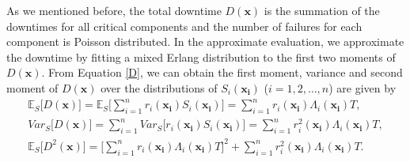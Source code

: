 \documentclass[preprint,12pt]{elsarticle}
\begin{document}
As we mentioned before, the total downtime $D(\boldsymbol{x})$ is the summation of the downtimes for all critical components and the number of failures for each component is Poisson distributed. In the approximate evaluation, we approximate the downtime by fitting a mixed Erlang distribution to the first two moments of $D(\boldsymbol{x})$. From Equation \eqref{D}, we can obtain the first moment, variance and second moment of $D(\boldsymbol{x})$ over the distributions of $S_{i}(\boldsymbol{x_{i}})$ ($i=1,2,\dots,n$) are given by
\begin{eqnarray}
\mathbb{E}_{S}\bigg[D(\boldsymbol{x})\bigg]=\mathbb{E}_{S}\bigg[\sum_{i=1}^{n}{r_{i}(\boldsymbol{x_{i}})S_{i}(\boldsymbol{x_{i}})}\bigg]=\sum_{i=1}^{n}{r_{i}(\boldsymbol{x_{i}})\Lambda_{i}(\boldsymbol{x_{i}})T},
\label{ED1}\\
Var_{S}\bigg[D(\boldsymbol{x})\bigg]=\sum_{i=1}^{n}{Var_{S}\bigg[{r_{i}(\boldsymbol{x_{i}})S_{i}(\boldsymbol{x_{i}})}\bigg]}=\sum_{i=1}^{n}{r_{i}^{2}(\boldsymbol{x_{i}})\Lambda_{i}(\boldsymbol{x_{i}})T},
\label{VD1}\\
\mathbb{E}_{S}\bigg[D^{2}(\boldsymbol{x}) \bigg]= \bigg[\sum_{i=1}^{n}{r_{i}(\boldsymbol{x_{i}})\Lambda_{i}(\boldsymbol{x_{i}})T}\bigg]^{2} + \sum_{i=1}^{n}{r_{i}^{2}(\boldsymbol{x_{i}})\Lambda_{i}(\boldsymbol{x_{i}})T}.
\end{eqnarray}
\end{document}
